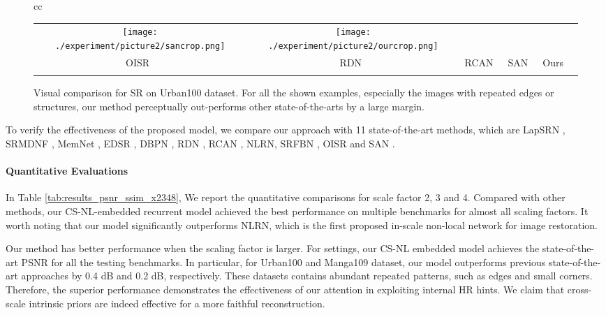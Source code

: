 \documentclass[10pt,twocolumn,letterpaper]{article}
\newcommand{\widthscalefive}{0.145}
\begin{document}
\begin{figure*}[htbp]
\begin{tabular}{cc}
\begin{adjustbox}{valign=t}
\begin{tabular}{cccccc}
				\texttt{[image: ./experiment/picture2/sancrop.png]} \hspace{\fsdttwofigBD} &
				\texttt{[image: ./experiment/picture2/ourcrop.png]}  
				\\ 
				OISR~\cite{he2019ode} \hspace{\fsdttwofigBD} &
				RDN~\cite{zhang2018residual} \hspace{\fsdttwofigBD} &
				RCAN~\cite{zhang2018image} \hspace{\fsdttwofigBD} &
				SAN~\cite{dai2019second}  \hspace{\fsdttwofigBD} &
				Ours
				\\
				
				\\
			\end{tabular}
		\end{adjustbox}
	\end{tabular}
	\caption{
		Visual comparison for  SR on Urban100 dataset. For all the shown examples, especially the images with repeated edges or structures, our method perceptually out-performs other state-of-the-arts by a large margin.
	}
	\label{tab:table 4}
\vspace{-3mm}
\end{figure*}
 To verify the effectiveness of the proposed model, we compare our approach with 11 state-of-the-art methods, which are LapSRN \cite{lai2017deep}, SRMDNF \cite{zhang2018learning}, MemNet \cite{tai2017memnet}, EDSR \cite{lim2017enhanced}, DBPN \cite{haris2018deep}, RDN \cite{zhang2018residual}, RCAN \cite{zhang2018image}, NLRN\cite{liu2018non}, SRFBN \cite{li2019feedback}, OISR \cite{he2019ode} and SAN \cite{dai2019second}. 

\paragraph{Quantitative Evaluations}
In Table \ref{tab:results_psnr_ssim_x2348}, We report the quantitative comparisons for scale factor 2, 3 and 4. Compared with other methods, our CS-NL-embedded recurrent model achieved the best performance on multiple benchmarks for almost all scaling factors. It worth noting that our model significantly outperforms NLRN, which is the first proposed in-scale non-local network for image restoration. 

Our method has better performance when the scaling factor is larger. For  settings, our CS-NL embedded model achieves the state-of-the-art PSNR for all the testing benchmarks. In particular, for Urban100 and Manga109 dataset, our model outperforms previous state-of-the-art approaches by 0.4 dB and 0.2 dB, respectively. These datasets contains abundant repeated patterns, such as edges and small corners. Therefore, the superior performance demonstrates the effectiveness of our attention in exploiting internal HR hints. We claim that cross-scale intrinsic priors are indeed effective for a more faithful reconstruction.
\end{document}
